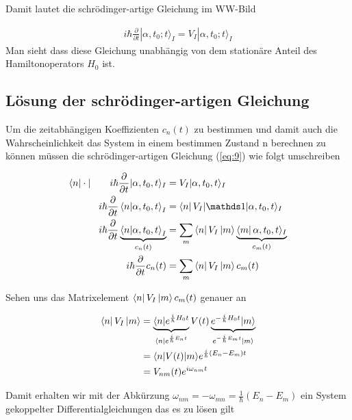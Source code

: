 Damit lautet die schrödinger-artige Gleichung im WW-Bild

\begin{align}
  \label{eq:9}
  \boxed{i\hbar \frac{\partial}{\partial t} |\alpha,t_0;t\rangle_I = V_I|\alpha,t_0;t\rangle_I}
\end{align}
Man sieht dass diese Gleichung unabhängig von dem stationäre Anteil des Hamiltonoperators \(H_0\) ist.

\subsection*{Lösung der schrödinger-artigen Gleichung}

Um die zeitabhängigen Koeffizienten \(c_n(t)\) zu bestimmen und damit auch die Wahrscheinlichkeit das System in einem bestimmen Zustand n berechnen zu können müssen die schrödinger-artigen Gleichung (\ref{eq:9}) wie folgt umschreiben

\begin{align}
  \label{eq:10}
  \bra{n}\cdot|\qquad  i\hbar \frac{\partial}{\partial t}|\alpha,t_0,t\rangle_I &= V_I|\alpha,t_0,t\rangle_I \notag \\
 i\hbar \frac{\partial}{\partial t}\braket{n}{\alpha,t_0,t}_I &= \bra{n}V_I|\mathds 1|\alpha,t_0,t\rangle_I \notag \\
i\hbar \frac{\partial}{\partial t}\underbr{\braket{n}{\alpha,t_0,t}_I}_{c_n(t)} &= \sum_m\bra{n}V_I \ket{m}\underbr{\bra{m}\alpha,t_0,t\rangle_I}_{c_m(t)} \notag \\
i\hbar \frac{\partial}{\partial t}c_n(t) &= \sum_m\bra{n}V_I \ket{m}c_m(t) 
\end{align}

Sehen uns das Matrixelement \(\left\langle n \right|V_I \left| m \right\rangle c_m(t) \) genauer an

\begin{align}
  \label{eq:11}
  \left\langle n \right|V_I \left| m \right\rangle &=  \underbrace{\langle n | e^{\frac{i}{\hbar}H_0t}}_{\langle n|e^{\frac{i}{\hbar}E_nt}}V(t)\underbrace{e^{-\frac{i}{\hbar}H_0t}|m\rangle}_{e^{-\frac{i}{\hbar}E_mt}|m\rangle } \notag\\
& = \langle n|V(t)|m\rangle e^{\frac{i}{\hbar}(E_n-E_m)t} \notag \\
&= V_{nm}(t) e^{i\omega_{nm} t}
\end{align}

Damit erhalten wir mit der Abkürzung \(\omega_{nm} = - \omega_{mn} = \frac{1}{\hbar}(E_n - E_m)\) ein System gekoppelter Differentialgleichungen das es zu lösen gilt

